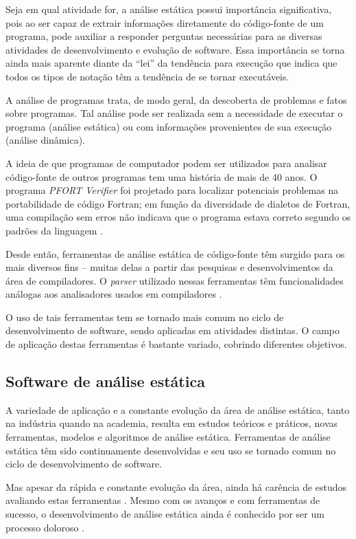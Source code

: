 Seja em qual atividade for, a análise estática possui importância significativa,
pois ao ser capaz de extrair informações diretamente do
código-fonte de um programa, pode auxiliar a responder perguntas necessárias
para as diversas atividades de desenvolvimento e evolução de software. Essa
importância se torna ainda mais aparente diante da ``lei'' da tendência para
execução \cite{harman2010why} que indica que todos os tipos de notação têm a
tendência de se tornar executáveis.

A análise de programas trata, de modo geral, da descoberta de problemas e
fatos sobre programas. Tal análise pode ser realizada sem a necessidade de executar o
programa (análise estática) ou com informações provenientes de sua execução
(análise dinâmica).

A ideia de que programas de computador podem ser utilizados para analisar
código-fonte de outros programas tem uma história de mais de 40 anos.  O
programa {\it PFORT Verifier} \cite{ryder1974pfort} foi projetado para localizar potenciais
problemas na portabilidade de código Fortran; em função da diversidade de
dialetos de Fortran, uma compilação sem erros não indicava que o programa
estava correto segundo os padrões da linguagem \cite{wichmann1995industrial}.

Desde então, ferramentas de análise estática de código-fonte têm surgido para
os mais diversos fins -- muitas delas a partir das pesquisas e
desenvolvimentos da área de compiladores.  O {\it parser} utilizado nessas
ferramentas têm funcionalidades análogas aos analisadores usados em
compiladores \cite{anderson2008the}.

O uso de tais ferramentas tem se tornado mais comum no ciclo de desenvolvimento de
software, sendo aplicadas em atividades distintas.
O campo de aplicação destas ferramentas é bastante variado, cobrindo diferentes
objetivos.

\subsection{Software de análise estática}

A variedade de aplicação e a constante evolução da área de análise estática, 
tanto na indústria quando na academia, resulta em  estudos teóricos e práticos, novas ferramentas, modelos e
algoritmos de análise estática. Ferramentas de análise estática têm sido
continuamente desenvolvidas e seu uso se tornado comum no ciclo de desenvolvimento de
software.

Mas apesar da rápida e constante evolução da área, ainda há carência de estudos
avaliando estas ferramentas \cite{li2010comparative}. Mesmo com os avanços e com
ferramentas de sucesso, o desenvolvimento de análise estática ainda é conhecido
por ser um processo doloroso \cite{toman2017taming}.


